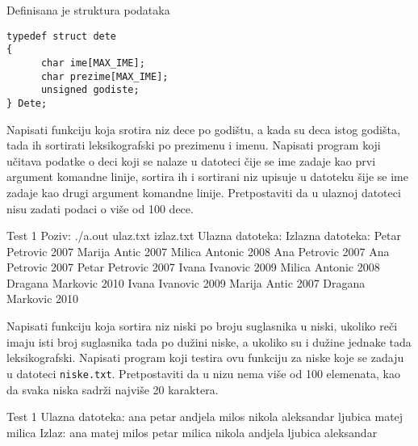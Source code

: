 \begin{Exercise}[label=508]
  Definisana je struktura podataka
\begin{verbatim}
typedef struct dete
{
      char ime[MAX_IME];
      char prezime[MAX_IME];
      unsigned godiste;
} Dete;
\end{verbatim}
Napisati funkciju koja srotira niz dece po godi\v{s}tu, a kada su deca
istog godi\v{s}ta, tada ih sortirati leksikografski po prezimenu i
imenu. Napisati program koji u\v{c}itava podatke o deci koji se nalaze
u datoteci \v{c}ije se ime zadaje kao prvi argument komandne linije,
sortira ih i sortirani niz upisuje u datoteku \v{s}ije se ime zadaje
kao drugi argument komandne linije. Pretpostaviti da u ulaznoj
datoteci nisu zadati podaci o vi\v{s}e od 100 dece.
  
  \begin{maxitest}
    \begin{test}{Test 1}
Poziv: ./a.out ulaz.txt izlaz.txt
Ulazna datoteka:                 Izlazna datoteka:
Petar Petrovic 2007              Marija Antic 2007
Milica Antonic 2008              Ana Petrovic 2007
Ana Petrovic 2007                Petar Petrovic 2007
Ivana Ivanovic 2009              Milica Antonic 2008
Dragana Markovic 2010            Ivana Ivanovic 2009
Marija Antic 2007                Dragana Markovic 2010
    \end{test}
  \end{maxitest}
  
\end{Exercise}

\begin{Exercise}[label=509]
  Napisati funkciju koja sortira niz niski po broju suglasnika u
  niski, ukoliko re\v{c}i imaju isti broj suglasnika tada po
  du\v{z}ini niske, a ukoliko su i du\v{z}ine jednake tada
  leksikografski.  Napisati program koji testira ovu funkciju za niske
  koje se zadaju u datoteci \verb|niske.txt|.  Pretpostaviti da u nizu
  nema vi\v{s}e od 100 elemenata, kao da svaka niska sadr\v{z}i
  najvi\v{s}e 20 karaktera.
  
  \begin{maxitest}
    \begin{test}{Test 1}
Ulazna datoteka:
ana petar andjela milos nikola aleksandar ljubica matej milica
Izlaz:
ana matej milos petar milica nikola andjela ljubica aleksandar
    \end{test}
  \end{maxitest}
  
\end{Exercise}

